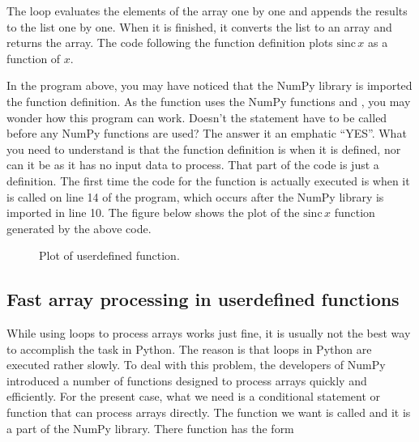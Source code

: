 \documentclass[letterpaper,10pt,english]{sphinxmanual}
\begin{document}
\sphinxAtStartPar
The  loop evaluates the elements of the  array one by one and appends the results to the list  one by one.  When it is finished, it converts the list to an array and returns the array.  The code following the function definition plots \(\mathrm{sinc}\,x\) as a function of \(x\).

\sphinxAtStartPar
In the program above, you may have noticed that the NumPy library is imported  the  function definition.  As the function uses the NumPy functions  and , you may wonder how this program can work.  Doesn’t the  statement have to be called before any NumPy functions are used?  The answer it an emphatic “YES”.  What you need to understand is that the function definition is  when it is defined, nor can it be as it has no input  data to process.  That part of the code is just a definition.  The first time the code for the  function is actually executed is when it is called on line 14 of the program, which occurs after the NumPy library is imported in line 10.  The figure below shows the plot of the \(\mathrm{sinc}\,x\) function generated by the above code.

\begin{figure}[htbp]
\centering
\capstart

\noindent{}
\caption{Plot of user\sphinxhyphen{}defined  function.}\label{\detokenize{chap7/chap7_funcs:id1}}\end{figure}

\ignorespaces 

\subsection{Fast array processing in user\sphinxhyphen{}defined functions}
\label{\detokenize{chap7/chap7_funcs:fast-array-processing-in-user-defined-functions}}\label{\detokenize{chap7/chap7_funcs:index-2}}
\sphinxAtStartPar
While using loops to process arrays works just fine, it is usually not the best way to accomplish the task in Python.  The reason is that loops in Python are executed rather slowly.  To deal with this problem, the developers of NumPy introduced a number of functions designed to process arrays quickly and efficiently.  For the present case, what we need is a conditional statement or function that can process arrays directly.  The function we want is called  and it is a part of the NumPy library.  There  function has the form
\end{document}
